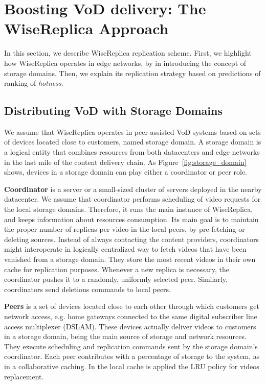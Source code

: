\section{Boosting VoD delivery: The WiseReplica Approach}
\label{sec:replication_scheme}

In this section, we describe WiseReplica replication scheme. First, we highlight how WiseReplica operates in edge networks, by in introducing the concept of storage domains. Then, we explain its replication strategy based on predictions of ranking of \emph{hotness}.

\subsection{Distributing VoD with Storage Domains}
\label{subsec:replication_scheme_sd}


We assume that WiseReplica operates in peer-assisted VoD systems based on sets of devices located close to customers, named storage domain. A storage domain is a logical
entity that combines resources from both datacenters and edge networks in the last mile of the content delivery chain. As Figure~\ref{fig:storage_domain} shows, devices in a storage domain can play either a coordinator or peer role. 

\noindent
\textbf{Coordinator} is a server or a small-sized cluster of servers deployed in the nearby datacenter. We assume that coordinator performs scheduling of video requests for the local storage domains. Therefore, it runs the main instance of WiseReplica, and keeps information about resources consumption. Its main goal is to maintain the proper number of replicas per video in the local peers, by pre-fetching or deleting sources. Instead of always contacting the content providers, coordinators might interoperate in logically centralized way to fetch videos that have been vanished from a storage domain. They store the most recent videos in their own cache for replication purposes. Whenever a new replica is necessary, the coordinator pushes it to a randomly, uniformly selected peer. Similarly, coordinators send deletions commands to local peers. 

\noindent
\textbf{Peers} is a set of devices located close to each other through which customers get network access, e.g. home gateways connected to the same digital subscriber line access multiplexer (DSLAM). These devices actually deliver videos to customers in a storage domain, being the main source of storage and network resources. They execute scheduling and replication commands sent by the storage domain's coordinator. Each peer contributes with a percentage of storage to the system, as in a collaborative caching. In the local cache is applied the LRU policy for videos replacement.

